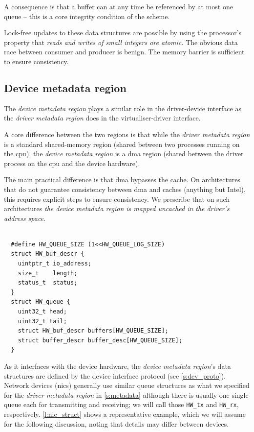 \documentclass[a4paper,12pt]{report}
\newcommand{\code}[1]{\texttt{#1}}
\newcommand{\Obj}[1]{\textsl{#1}}
\begin{document}
A consequence is that a buffer can at any time be referenced by at most one queue
-- this is a core integrity condition of the scheme.

Lock-free updates to these data structures are possible by
using the processor's property that \emph{reads and writes of small
integers are atomic.} The obvious data race between consumer and
producer is benign. The memory barrier is sufficient
to ensure consistency.

\subsection{Device metadata region}\label{s:dev-md}

The \Obj{device metadata region} plays a similar role in the driver-device interface
as the \Obj{driver metadata region} does in the virtualiser-driver interface.

A core difference between the two regions is that while the
\Obj{driver metadata
region} is a standard shared-memory region (shared between two
processes running on the \gls{cpu}), the \Obj{device metadata region} is a \gls{dma}
region (shared between the driver process on the \gls{cpu} and the device
hardware).

The main practical difference is that \gls{dma} bypasses the cache.  On
architectures that do not guarantee consistency between \gls{dma} and caches
(anything but Intel), this requires explicit steps to ensure
consistency. We prescribe that on such architectures \emph{the device metadata
region is mapped uncached in the driver's address space}.

\begin{lstlisting}[gobble=2,
  firstline=2,float=ht,tabsize=2,
  label={l:nic_struct},
  caption={Typical network device queue data structures.}]

  #define HW_QUEUE_SIZE (1<<HW_QUEUE_LOG_SIZE)
  struct HW_buf_descr {
    uintptr_t io_address;
    size_t    length;
    status_t  status;
  }
  struct HW_queue {
    uint32_t head;
    uint32_t tail;
    struct HW_buf_descr buffers[HW_QUEUE_SIZE];
    struct buffer_descr buffer_desc[HW_QUEUE_SIZE];
  }
\end{lstlisting}

As it interfaces with the device hardware, the \Obj{device metadata region}'s data
structures are defined by the device interface protocol (see
\autoref{s:dev_proto}). Network devices (\glspl{nic}) generally
use similar queue structures as what we specified for the \emph{driver
metadata region} in \autoref{s:metadata}
although there is usually one single queue each for transmitting and
receiving; we will call those \code{HW\_\gls{tx}} and \code{HW\_\gls{rx}},
respectively. \autoref{l:nic_struct} shows a representative example,
which we will assume for the following discussion, noting that details
may differ between devices.
\end{document}
